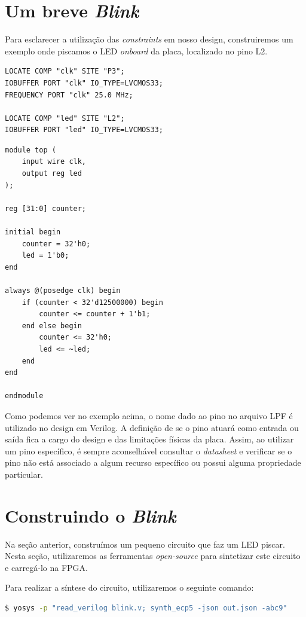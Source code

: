 \documentclass{report}
\begin{document}
\section{Um breve \textit{Blink}}

Para esclarecer a utilização das \textit{constraints} em nosso design, construiremos um exemplo onde piscamos o LED \textit{onboard} da placa, localizado no pino L2.

\begin{lstlisting}[language=LPF, caption={Arquivo blink.lpf}]
LOCATE COMP "clk" SITE "P3";
IOBUFFER PORT "clk" IO_TYPE=LVCMOS33;
FREQUENCY PORT "clk" 25.0 MHz;

LOCATE COMP "led" SITE "L2";
IOBUFFER PORT "led" IO_TYPE=LVCMOS33;
\end{lstlisting}

\begin{lstlisting}[style=verilog-style, caption={Arquivo blink.v}]
module top (
    input wire clk,
    output reg led
);

reg [31:0] counter;

initial begin
    counter = 32'h0;
    led = 1'b0;
end

always @(posedge clk) begin
    if (counter < 32'd12500000) begin
        counter <= counter + 1'b1;
    end else begin
        counter <= 32'h0;
        led <= ~led;
    end 
end

endmodule
\end{lstlisting}

Como podemos ver no exemplo acima, o nome dado ao pino no arquivo LPF é utilizado no design em Verilog. A definição de se o pino atuará como entrada ou saída fica a cargo do design e das limitações físicas da placa. Assim, ao utilizar um pino específico, é sempre aconselhável consultar o \textit{datasheet} e verificar se o pino não está associado a algum recurso específico ou possui alguma propriedade particular.

\section{Construindo o \textit{Blink}}

Na seção anterior, construímos um pequeno circuito que faz um LED piscar. Nesta seção, utilizaremos as ferramentas \textit{open-source} para sintetizar este circuito e carregá-lo na FPGA.

Para realizar a síntese do circuito, utilizaremos o seguinte comando:

\begin{lstlisting}[language=bash]
$ yosys -p "read_verilog blink.v; synth_ecp5 -json out.json -abc9"
\end{lstlisting}
\end{document}
